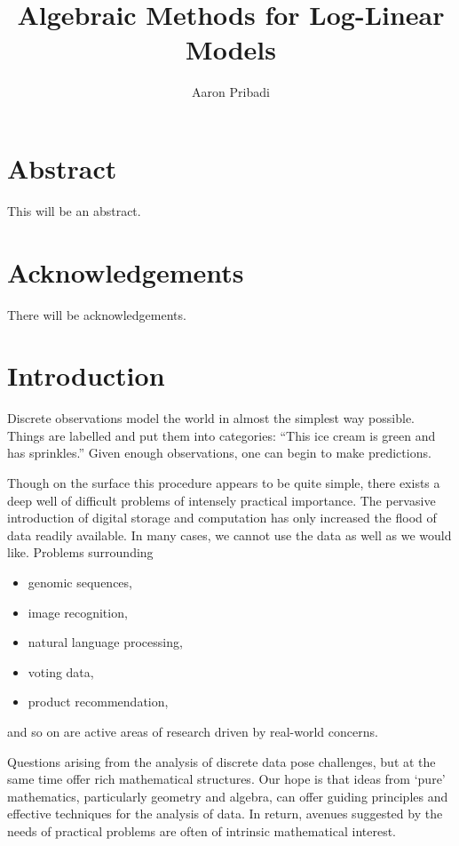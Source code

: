 \documentclass[cclicense]{hmcthesis}
\title{Algebraic Methods for Log-Linear Models}
\author{Aaron Pribadi}
\numberwithin{equation}{chapter}
\numberwithin{thmcounter}{chapter}
\begin{document}
\frontmatter

\maketitle

\tableofcontents




\chapter{Abstract}
    This will be an abstract.

\chapter{Acknowledgements}
    There will be acknowledgements.

\mainmatter

\chapter{Introduction}

    Discrete observations model the world in almost the simplest way possible.
    Things are labelled and put them into categories: ``This ice cream is green
    and has sprinkles.''  Given enough observations, one can begin to make
    predictions.
    
    Though on the surface this procedure appears to be quite simple, there
    exists a deep well of difficult problems of intensely practical importance.
    The pervasive introduction of digital storage and computation has only
    increased the flood of data readily available.  In many cases, we cannot use
    the data as well as we would like.  Problems surrounding 
    \begin{itemize}\noparspace
    \item genomic sequences,
    \item image recognition, 
    \item natural language processing,
    \item voting data, 
    \item product recommendation, 
    \end{itemize}
    and so on are active areas of research driven by real-world concerns.

    Questions arising from the analysis of discrete data pose challenges, but at
    the same time offer rich mathematical structures.  Our hope is that ideas
    from `pure' mathematics, particularly geometry and algebra, can offer
    guiding principles and effective techniques for the analysis of data.  In
    return, avenues suggested by the needs of practical problems are often of
    intrinsic mathematical interest.
    
\end{document}
